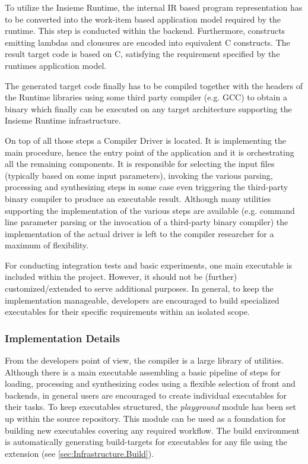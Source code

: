 To utilize the Insieme Runtime, the internal IR based program representation has
to be converted into the work-item based application model required by the
runtime. This step is conducted within the backend. Furthermore, constructs
emitting lambdas and clousures are encoded into equivalent C constructs. The
result target code is based on C, satisfying the requirement specified by the
runtimes application model.

The generated target code finally has to be compiled together with the
headers of the Runtime libraries using some third party compiler (e.g. GCC) to
obtain a binary which finally can be executed on any target architecture
supporting the Insieme Runtime infrastructure.

On top of all those steps a Compiler Driver is located. It is implementing the
main procedure, hence the entry point of the application and it is orchestrating
all the remaining components. It is responsible for selecting the input files
(typically based on some input parameters), invoking the various parsing,
processing and synthesizing steps in some case even triggering the third-party
binary compiler to produce an executable result. Although many utilities
supporting the implementation of the various steps are available (e.g. command
line parameter parsing or the invocation of a third-party binary compiler) the
implementation of the actual driver is left to the compiler researcher for a
maximum of flexibility. 

For conducting integration tests and basic experiments, one main executable is
included within the project. However, it should not be (further)
customized/extended to serve additional purposes. In general, to keep the
implementation manageable, developers are encouraged to build specialized
executables for their specific requirements within an isolated scope.



\subsubsection{Implementation Details}
From the developers point of view, the compiler is a large library of utilities.
Although there is a main executable assembling a basic pipeline of steps for
loading, processing and synthesizing codes using a flexible selection of front
and backends, in general users are encouraged to create individual executables
for their tasks. To keep executables structured, the \textit{playground} module
has been set up within the source repository. This module can be used as a
foundation for building new executables covering any required workflow. The
build environment is automatically generating build-targets for executables for
any file using the  extension (see \ref{sec:Infrastructure.Build}).


